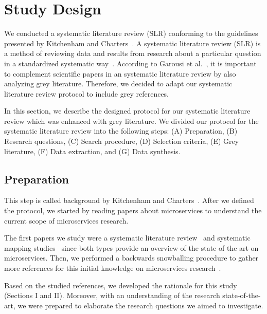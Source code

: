 
\section{Study Design}\label{sec:study-design}

We conducted a systematic literature review (SLR) conforming to the guidelines presented by Kitchenham and Charters~\cite{Kitchenham2007}. A systematic literature review (SLR) is a method of reviewing data and results from research about a particular question in a standardized systematic way~\cite{Sebastian2018}. According to Garousi et al.~\cite{Garousi2016}, it is important to complement scientific papers in an systematic literature review by also analyzing grey literature. Therefore, we decided to adapt our systematic literature review protocol to include grey references.


In this section, we describe the designed protocol for our systematic literature review which was enhanced with grey literature. We divided our protocol for the systematic literature review into the following steps: (A) Preparation, (B) Research questions, (C) Search procedure, (D) Selection criteria, (E) Grey literature, (F) Data extraction, and (G) Data synthesis.

\subsection{Preparation}

This step is called background by Kitchenham and Charters~\cite{Kitchenham2007}. After we defined the protocol, we started by reading papers about microservices to understand the current scope of microservices research. 

The first papers we study were a systematic literature review~\cite{Ghani2019} and systematic mapping studies~\cite{Claus2016, Francesco2019} since both types provide an overview of the state of the art on microservices. Then, we performed a backwards snowballing procedure to gather more references for this initial knowledge on microservices research~\cite{Shady2020, Michael2018, Toledo2019, Dragoni2017, Kevin2015, Larrucea2018, Osses2019, Meshenberg2016, Matt2016, Soldani2018, Olaf2016}.

Based on the studied references, we developed the rationale for this study (Sections I and II). Moreover, with an understanding of the research state-of-the-art, we were prepared to elaborate the research questions we aimed to investigate. 


